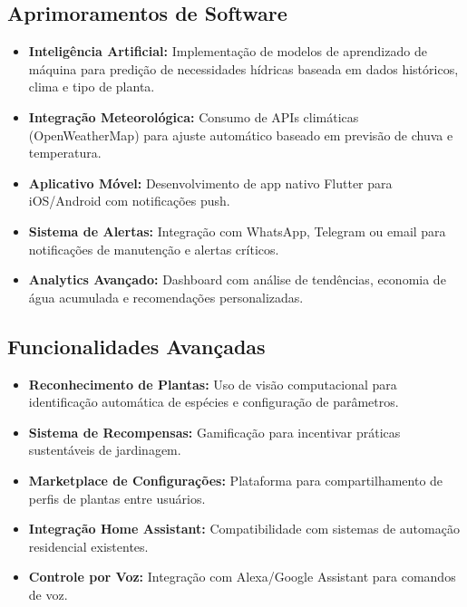 \subsection{Aprimoramentos de Software}
\begin{itemize}
    \item \textbf{Inteligência Artificial:} Implementação de modelos de aprendizado de máquina para predição de necessidades hídricas baseada em dados históricos, clima e tipo de planta.
    \item \textbf{Integração Meteorológica:} Consumo de APIs climáticas (OpenWeatherMap) para ajuste automático baseado em previsão de chuva e temperatura.
    \item \textbf{Aplicativo Móvel:} Desenvolvimento de app nativo Flutter para iOS/Android com notificações push.
    \item \textbf{Sistema de Alertas:} Integração com WhatsApp, Telegram ou email para notificações de manutenção e alertas críticos.
    \item \textbf{Analytics Avançado:} Dashboard com análise de tendências, economia de água acumulada e recomendações personalizadas.
\end{itemize}

\subsection{Funcionalidades Avançadas}
\begin{itemize}
    \item \textbf{Reconhecimento de Plantas:} Uso de visão computacional para identificação automática de espécies e configuração de parâmetros.
    \item \textbf{Sistema de Recompensas:} Gamificação para incentivar práticas sustentáveis de jardinagem.
    \item \textbf{Marketplace de Configurações:} Plataforma para compartilhamento de perfis de plantas entre usuários.
    \item \textbf{Integração Home Assistant:} Compatibilidade com sistemas de automação residencial existentes.
    \item \textbf{Controle por Voz:} Integração com Alexa/Google Assistant para comandos de voz.
\end{itemize}

